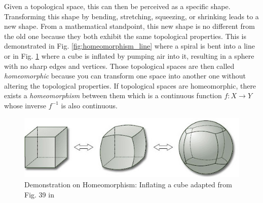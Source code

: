 Given a topological space, this can then be perceived as a specific shape. Transforming this shape by bending, stretching, squeezing, or shrinking leads to a new shape. From a mathematical standpoint, this new shape is no different from the old one because they both exhibit the same topological properties. This is demonstrated in Fig. \ref{fig:homeomorphism_line} where a spiral is bent into a line or in Fig. \ref{fig:homeomorphism} where a cube is inflated by pumping air into it, resulting in a sphere with no sharp edges and vertices. Those topological spaces are then called \textit{homeomorphic} because you can transform one space into another one without altering the topological properties. If topological spaces are homeomorphic, there exists a \textit{homeomorphism} between them which is a continuous function $f: X \to Y$ whose inverse $f^{-1}$ is also continuous. \cite{wiki_homeomorphism}
\begin{figure}[!]
	\centering
	\includegraphics[width=\columnwidth]{images/homeomorphism.jpg}
	\caption[Demonstration on Homeomorphism]{Demonstration on Homeomorphism: Inflating a cube adapted from Fig. 39 in \footnotemark}
    \label{fig:homeomorphism}
\end{figure}

